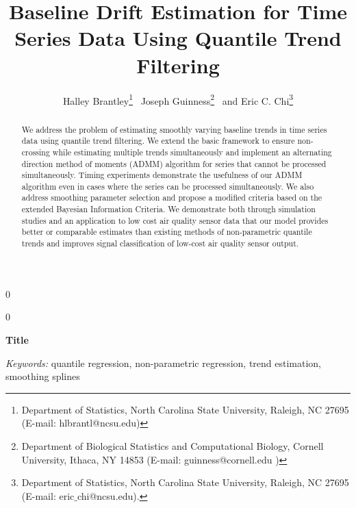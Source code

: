 \documentclass[12pt]{article}
\newcommand{\blind}{0}
\begin{document}
	
	
	\def\spacingset#1{\renewcommand{\baselinestretch}%
		{#1}\small\normalsize} \spacingset{1}
	
	
	
	\blind
	{
		\title{\bf Baseline Drift Estimation for Time Series Data Using Quantile Trend Filtering}
		\author{Halley Brantley\thanks{
				Department of Statistics, North Carolina State University, Raleigh, NC 27695 (E-mail: hlbrantl@ncsu.edu)} \,
			Joseph Guinness\thanks{
				Department of Biological Statistics and Computational Biology, Cornell University, Ithaca, NY 14853 (E-mail: guinness@cornell.edu )} \,
			and
			Eric C. Chi\thanks{Department of Statistics, North Carolina State University, Raleigh, NC 27695 (E-mail: eric$\_$chi@ncsu.edu).}    \\}
		\date{}
		\maketitle
	} \fi
		
	\blind
	{
		\bigskip
		\bigskip
		\bigskip
		\begin{center}
			{\LARGE\bf Title}
		\end{center}
		\medskip
	} \fi
	
	\bigskip
	\begin{abstract}
		We address the problem of estimating smoothly varying baseline trends in time series data using quantile trend filtering. We extend the basic framework to ensure non-crossing while estimating multiple trends simultaneously and implement an alternating direction method of moments (ADMM) algorithm for series that cannot be processed simultaneously. Timing experiments demonstrate the usefulness of our ADMM algorithm even in cases where the series can be processed simultaneously. We also address smoothing parameter selection and propose a modified criteria based on the extended Bayesian Information Criteria. We demonstrate both through simulation studies and an application to low cost air quality sensor data that our model provides better or comparable estimates than existing methods of non-parametric quantile trends and improves signal classification of low-cost air quality sensor output. 
	\end{abstract}
	
	\noindent%
	{\it Keywords:} quantile regression, non-parametric regression, trend estimation, smoothing splines
	\vfill
	
\end{document}
